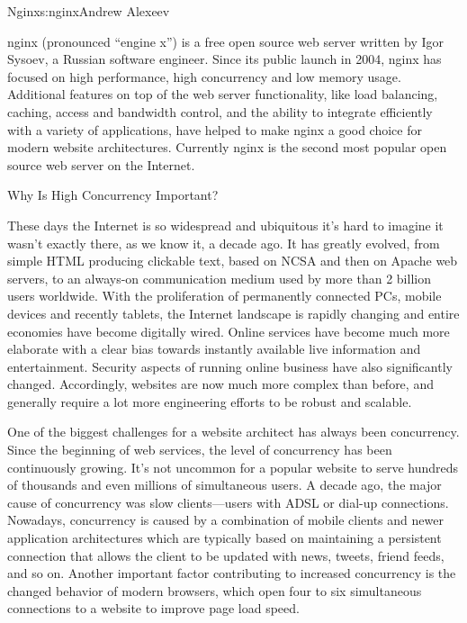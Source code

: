 \begin{aosachapter}{Nginx}{s:nginx}{Andrew Alexeev}

nginx (pronounced ``engine x'') is a free open source web server
written by Igor Sysoev, a Russian software engineer. Since its public
launch in 2004, nginx has focused on high performance, high
concurrency and low memory usage. Additional features on top of the
web server functionality, like load balancing, caching, access and
bandwidth control, and the ability to integrate efficiently with a
variety of applications, have helped to make nginx a good choice for
modern website architectures. Currently nginx is the second most
popular open source web server on the Internet.

\begin{aosasect1}{Why Is High Concurrency Important?}


These days the Internet is so widespread and ubiquitous it's hard to
imagine it wasn't exactly there, as we know it, a decade ago. It has greatly evolved,
from simple HTML producing clickable text, based on NCSA and then on
Apache web servers, to an always-on communication medium used by more
than 2 billion users worldwide. With the proliferation of permanently
connected PCs, mobile devices and recently tablets, the Internet
landscape is rapidly changing and entire economies have become
digitally wired. Online services have become much more elaborate with
a clear bias towards instantly available live information and
entertainment. Security aspects of running online business have also
significantly changed. Accordingly, websites are now much more complex
than before, and generally require a lot more engineering efforts to
be robust and scalable.

One of the biggest challenges for a website architect has always been
concurrency. Since the beginning of web services, the level of
concurrency has been continuously growing. It's not uncommon for a
popular website to serve hundreds of thousands and even millions of
simultaneous users. A decade ago, the major cause of concurrency was
slow clients---users with ADSL or dial-up connections. Nowadays,
concurrency is caused by a combination of mobile clients and newer
application architectures which are typically based on maintaining a
persistent connection that allows the client to be updated with news,
tweets, friend feeds, and so on. Another important factor contributing
to increased concurrency is the changed behavior of modern browsers,
which open four to six simultaneous connections to a website to
improve page load speed.


\end{aosasect1}
\end{aosachapter}
